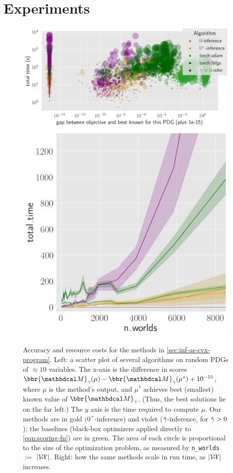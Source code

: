 


\section{Experiments} \label{sec:expts}


\begin{figure}
    \centering
        \includegraphics[width=0.67\linewidth]{figs/rand-joint/joint-gap-vs-time-relabeled}
        \includegraphics[width=0.32\linewidth]{figs/rand-joint/time-diff}
    \caption[Empirical results: accuracy and resource costs for the inference algorithm and baselines]{
        Accuracy and resource costs for the methods in \cref{sec:inf-as-cvx-program}.  
        Left: a scatter plot of several algorithms on random PDGs of $\approx 10$ variables. The x-axis is 
            the difference in scores
            $\bbr{\dg M}_\gamma(\mu) - \bbr{\dg M}_{\gamma}(\mu^*) + 10^{-15}$,
        where $\mu$ is the method's output,
        and $\mu^*$ achieves best (smallest) known value of $\bbr{\dg M}_{\gamma}$.
         (Thus, the best solutions lie on the far left.)
        The $y$ axis is the time required to compute $\mu$. 
        Our methods are in gold $(0^+$\!-inference) and violet ($\zogamma$-inference, for $\zogamma>0$); the baselines (black-box optimizers applied directly to \eqref{eqn:scoring-fn}) are in green.
        The area of each circle is proportional to the size of the optimization problem, as measured by
        {\small\texttt{n\_worlds}}$:=$
        $|\mathcal V\!\mathcal X|$.
        Right: how the same methods scale in run time, as $|\mathcal V\!\mathcal X|$ increases.
     }\label{fig:joint-gap-time}
\end{figure}


